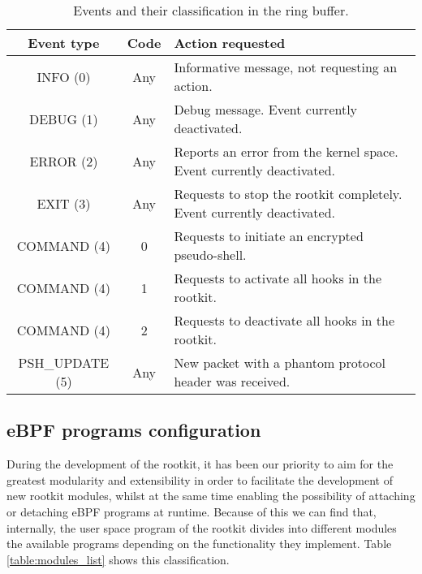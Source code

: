\begin{table}[htbp]
\begin{tabular}{|c|c|>{\centering\arraybackslash}p{8cm}|}
\hline
\textbf{Event type} & \textbf{Code} & \textbf{Action requested} \\
\hline
\hline
INFO (0) & Any & Informative message, not requesting an action.\\
\hline
DEBUG (1) & Any & Debug message. Event currently deactivated.\\
\hline
ERROR (2) & Any & Reports an error from the kernel space. Event currently deactivated.\\
\hline
EXIT (3) & Any & Requests to stop the rootkit completely. Event currently deactivated.\\
\hline
COMMAND (4) & 0 & Requests to initiate an encrypted pseudo-shell.\\
\hline
COMMAND (4) & 1 & Requests to activate all hooks in the rootkit.\\
\hline
COMMAND (4) & 2 & Requests to deactivate all hooks in the rootkit.\\
\hline
PSH\_UPDATE (5) & Any & New packet with a phantom protocol header was received.\\
\hline
\end{tabular}
\caption{Events and their classification in the ring buffer.}
\label{table:ring_buf_events}
\end{table}


\subsection{eBPF programs configuration} \label{subsection:ebpf_progs_config}
During the development of the rootkit, it has been our priority to aim for the greatest modularity and extensibility in order to facilitate the development of new rootkit modules, whilst at the same time enabling the possibility of attaching or detaching eBPF programs at runtime. Because of this we can find that, internally, the user space program of the rootkit divides into different modules the available programs depending on the functionality they implement. Table \ref{table:modules_list} shows this classification.

